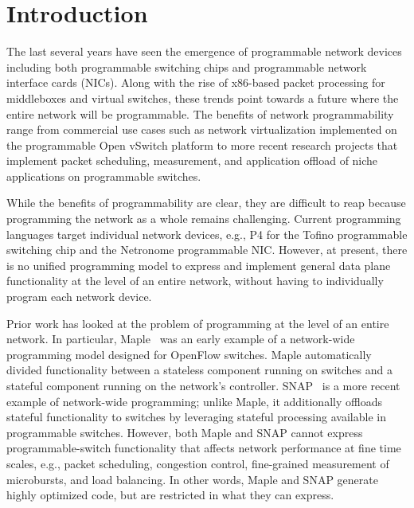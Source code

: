 \documentclass[12pt, oneside]{article}
\begin{document}
\newpage
\tableofcontents

\newpage
\listoffigures

\newpage
\lstlistoflistings

\newpage
\section{Introduction}
The last several years have seen the emergence of programmable network devices
including both programmable switching chips and programmable network interface
cards (NICs). Along with the rise of x86-based packet processing for
middleboxes and virtual switches, these trends point towards a future where the
entire network will be programmable. The benefits of network programmability
range from commercial use cases such as network virtualization implemented on
the programmable Open vSwitch platform to more recent research projects that
implement packet scheduling, measurement, and application offload of niche
applications on programmable switches.

While the benefits of programmability are clear, they are difficult to reap
because programming the network as a whole remains challenging. Current
programming languages target individual network devices, e.g., P4 for the
Tofino programmable switching chip and the Netronome programmable NIC. However,
at present, there is no unified programming model to express and implement
general data plane functionality at the level of an entire network, without
having to individually program each network device.

Prior work has looked at the problem of programming at the level of an entire
network. In particular, Maple~\cite{maple} was an early example of a
network-wide programming model designed for OpenFlow switches. Maple
automatically divided functionality between a stateless component running on
switches and a stateful component running on the network's controller.
SNAP~\cite{snap} is a more recent example of network-wide programming; unlike
Maple, it additionally offloads stateful functionality to switches by
leveraging stateful processing available in programmable switches.  However,
both Maple and SNAP cannot express programmable-switch functionality that
affects network performance at fine time scales, e.g., packet scheduling,
congestion control, fine-grained measurement of microbursts, and load
balancing. In other words, Maple and SNAP generate highly optimized code, but
are restricted in what they can express.
\end{document}
